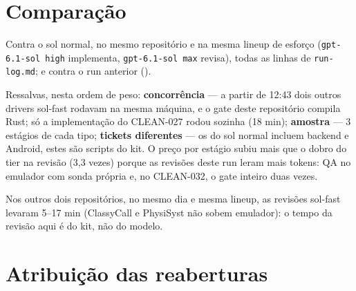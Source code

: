 \documentclass[11pt,a4paper]{article}
\begin{document}
\section{Comparação}

Contra o sol normal, no mesmo repositório e na mesma lineup de esforço
(\texttt{gpt-6.1-sol high} implementa, \texttt{gpt-6.1-sol max} revisa), todas
as linhas de \texttt{run-log.md}; e contra o run anterior
().

\medskip
{}

\medskip
Ressalvas, nesta ordem de peso: \textbf{concorrência} --- a partir de 12:43
dois outros drivers sol-fast rodavam na mesma máquina, e o gate deste
repositório compila Rust; só a implementação do CLEAN-027 rodou sozinha
(18 min); \textbf{amostra} --- 3 estágios de cada tipo; \textbf{tickets
diferentes} --- os do sol normal incluem backend e Android, estes são scripts
do kit. O preço por estágio subiu mais que o dobro do tier na revisão (3,3
vezes) porque as revisões deste run leram mais tokens: QA no emulador com
sonda própria e, no CLEAN-032, o gate inteiro duas vezes.

Nos outros dois repositórios, no mesmo dia e mesma lineup, as revisões
sol-fast levaram 5--17 min (ClassyCall e PhysiSyst não sobem emulador): o
tempo da revisão aqui é do kit, não do modelo.

\section{Atribuição das reaberturas}
\end{document}
